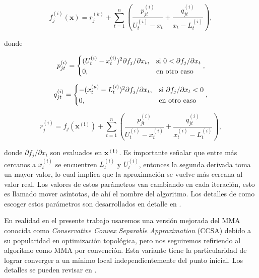 \begin{equation}
  f_j^{(i)}(\boldsymbol{x}) = r_j^{(k)} + \displaystyle\sum_{t=1}^n\left(\frac{p_{jt}^{(i)}}{U_t^{(i)} - x_t}
  + \frac{q_{jt}^{(i)}}{x_t - L_t^{(i)}} \right),
\end{equation}

donde

\begin{equation}
  p_{jt}^{(i)} = \begin{cases*}
    (U_t^{(i)} - x_t^{(i)})^2 \partial f_j / \partial x_t, & si $0 < \partial f_j / \partial x_t$\\
    0, & en otro caso
  \end{cases*},
\end{equation}

\begin{equation}
  q_{jt}^{(i)} = \begin{cases*}
    -(x_t^{(u)} - L_t^{(i)})^2 \partial f_j / \partial x_t, & si $\partial f_j / \partial x_t < 0$\\
    0, & en otro caso
  \end{cases*},
\end{equation}


\begin{equation}
  r_j^{(i)} =  f_j(\boldsymbol{x^{(i)}}) + \displaystyle\sum_{t=1}^n\left(\frac{p_{jt}^{(i)}}{U_t^{(i)} - x_t^{(i)}}
  + \frac{q_{jt}^{(i)}}{x_t^{(i)} - L_t^{(i)}} \right),
\end{equation}

donde $\partial f_j / \partial x_t$ son evaluados en $\boldsymbol{x^{(i)}}$.
Es importante señalar que entre más cercanos a $x_t^{(i)}$ se encuentren $L_t^{(i)}$ y $U_t^{(i)}$,
entonces la segunda derivada toma un mayor valor, lo cual implica que la aproximación se vuelve más 
cercana al valor real. 
Los valores de estos parámetros van cambiando en cada iteración, esto es llamado mover asíntotas, de ahí el
nombre del algoritmo. Los detalles de como escoger estos parámetros son desarrollados en detalle
en \cite{Svanberg1987}.


En realidad en el presente trabajo usaremos una versión mejorada del MMA
conocida como \emph{Conservative Convex Separable Approximation} (CCSA) 
debido a su popularidad en optimización topológica, pero nos seguiremos refiriendo
al algoritmo como MMA por convención.
Esta variante tiene la particularidad de lograr converger a un mínimo local independientemente
del punto inicial. Los detalles se pueden revisar en \cite{Svanberg2002}.

